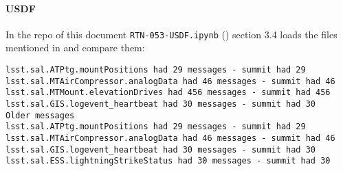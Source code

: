 \paragraph{USDF}
In the repo of this document \texttt{RTN-053-USDF.ipynb} ()  section 3.4
loads the files mentioned in  and compare them:

\begin{lstlisting}
lsst.sal.ATPtg.mountPositions had 29 messages - summit had 29
lsst.sal.MTAirCompressor.analogData had 46 messages - summit had 46
lsst.sal.MTMount.elevationDrives had 456 messages - summit had 456
lsst.sal.GIS.logevent_heartbeat had 30 messages - summit had 30
Older messages
lsst.sal.ATPtg.mountPositions had 29 messages - summit had 29
lsst.sal.MTAirCompressor.analogData had 46 messages - summit had 46
lsst.sal.GIS.logevent_heartbeat had 30 messages - summit had 30
lsst.sal.ESS.lightningStrikeStatus had 30 messages - summit had 30
\end{lstlisting}
